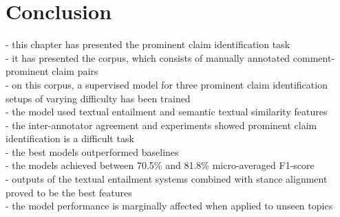
\section{Conclusion}
\label{sec:argrec_conclusion}

- this chapter has presented the prominent claim identification task \\
- it has presented the \ComArg corpus, which consists of manually annotated
comment-prominent claim pairs \\
- on this corpus, a supervised model for three prominent claim identification 
setups of varying difficulty has been trained  \\
- the model used textual entailment and semantic textual similarity features \\
- the inter-annotator agreement  and experiments showed prominent claim identification
is a difficult task \\
- the best models outperformed baselines \\
- the models achieved between 70.5\% and 81.8\% micro-averaged F1-score \\
- outputs of the textual entailment systems combined with stance alignment proved
to be the best features \\
- the model performance is marginally affected when applied to unseen topics \\
